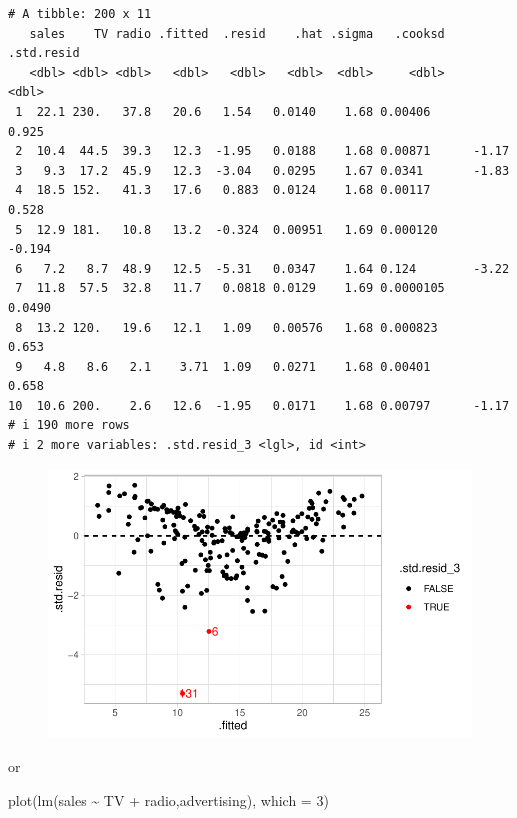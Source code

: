 \documentclass[
  letterpaper,
  DIV=11,
  numbers=noendperiod]{scrreprt}
\newenvironment{Shaded}{\begin{snugshade}}{\end{snugshade}}
\newcommand{\AttributeTok}[1]{\textcolor[rgb]{0.65,0.35,0.00}{#1}}
\newcommand{\DecValTok}[1]{\textcolor[rgb]{0.47,0.16,0.63}{#1}}
\newcommand{\FunctionTok}[1]{\textcolor[rgb]{0.02,0.16,0.49}{#1}}
\newcommand{\NormalTok}[1]{\textcolor[rgb]{0.33,0.33,0.33}{#1}}
\newcommand{\SpecialCharTok}[1]{\textcolor[rgb]{0.00,0.46,0.62}{#1}}
\begin{document}
\begin{verbatim}
# A tibble: 200 x 11
   sales    TV radio .fitted  .resid    .hat .sigma   .cooksd .std.resid
   <dbl> <dbl> <dbl>   <dbl>   <dbl>   <dbl>  <dbl>     <dbl>      <dbl>
 1  22.1 230.   37.8   20.6   1.54   0.0140    1.68 0.00406       0.925 
 2  10.4  44.5  39.3   12.3  -1.95   0.0188    1.68 0.00871      -1.17  
 3   9.3  17.2  45.9   12.3  -3.04   0.0295    1.67 0.0341       -1.83  
 4  18.5 152.   41.3   17.6   0.883  0.0124    1.68 0.00117       0.528 
 5  12.9 181.   10.8   13.2  -0.324  0.00951   1.69 0.000120     -0.194 
 6   7.2   8.7  48.9   12.5  -5.31   0.0347    1.64 0.124        -3.22  
 7  11.8  57.5  32.8   11.7   0.0818 0.0129    1.69 0.0000105     0.0490
 8  13.2 120.   19.6   12.1   1.09   0.00576   1.68 0.000823      0.653 
 9   4.8   8.6   2.1    3.71  1.09   0.0271    1.68 0.00401       0.658 
10  10.6 200.    2.6   12.6  -1.95   0.0171    1.68 0.00797      -1.17  
# i 190 more rows
# i 2 more variables: .std.resid_3 <lgl>, id <int>
\end{verbatim}

\begin{figure}[H]

{\centering \includegraphics{Chapter3_files/figure-pdf/unnamed-chunk-96-1.pdf}

}

\end{figure}

or

\begin{Shaded}
\begin{Highlighting}[]
\FunctionTok{plot}\NormalTok{(}\FunctionTok{lm}\NormalTok{(sales }\SpecialCharTok{\textasciitilde{}}\NormalTok{ TV }\SpecialCharTok{+}\NormalTok{ radio,advertising), }\AttributeTok{which =} \DecValTok{3}\NormalTok{)}
\end{Highlighting}
\end{Shaded}
\end{document}
